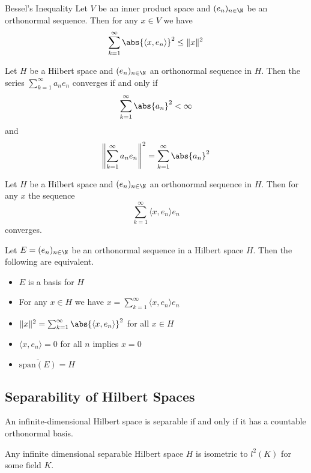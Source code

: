 \documentclass[a4paper]{article}
\begin{document}
\begin{lmm}{Bessel's Inequality}{} Let $V$ be an inner product space and $(e_n)_{n\in\N}$ be an orthonormal sequence. Then for any $x\in V$ we have $$\sum_{k=1}^\infty\abs{\langle x,e_n\rangle}^2\leq \|x\|^2$$
\end{lmm}

\begin{lmm}{}{} Let $H$ be a Hilbert space and $(e_n)_{n\in\N}$ an orthonormal sequence in $H$. Then the series $\sum_{k=1}^\infty a_ne_n$ converges if and only if $$\sum_{k=1}^\infty\abs{a_n}^2<\infty$$ and $$\left\|\sum_{k=1}^\infty a_ne_n\right\|^2=\sum_{k=1}^\infty\abs{a_n}^2$$
\end{lmm}

\begin{crl}{}{} Let $H$ be a Hilbert space and $(e_n)_{n\in\N}$ an orthonormal sequence in $H$. Then for any $x$ the sequence $$\sum_{k=1}^\infty\langle x,e_n\rangle e_n$$ converges. 
\end{crl}

\begin{prp}{}{} Let $E=(e_n)_{n\in\N}$ be an orthonormal sequence in a Hilbert space $H$. Then the following are equivalent. 
\begin{itemize}
\item $E$ is a basis for $H$
\item For any $x\in H$ we have $x=\sum_{k=1}^\infty\langle x,e_n\rangle e_n$
\item $\|x\|^2=\sum_{k=1}^\infty\abs{\langle x,e_n\rangle}^2$ for all $x\in H$
\item $\langle x,e_n\rangle=0$ for all $n$ implies $x=0$
\item $\overline{\text{span}(E)}=H$
\end{itemize}
\end{prp}

\subsection{Separability of Hilbert Spaces}
\begin{prp}{}{} An infinite-dimensional Hilbert space is separable if and only if it has a countable orthonormal basis. 
\end{prp}

\begin{thm}{}{} Any infinite dimensional separable Hilbert space $H$ is isometric to $l^2(K)$ for some field $K$. 
\end{thm}
\end{document}

